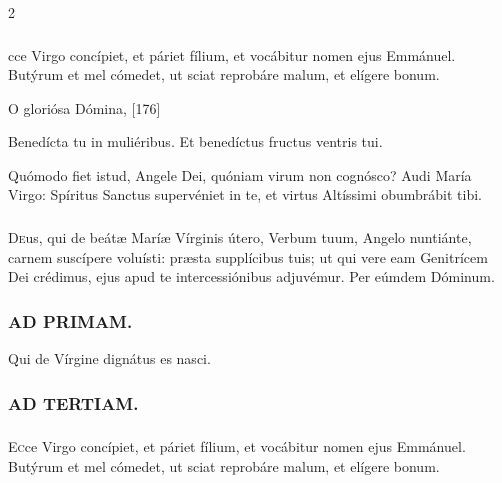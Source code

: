 \documentclass[9pt,twoside]{extarticle}
\begin{document}
\begin{multicols}{2}
\subsubsection*{}
cce Virgo concípiet, et páriet fílium, et vocábitur nomen ejus Emmánuel. Butýrum et mel cómedet, ut sciat reprobáre malum, et elígere bonum.

\begin{tightlist}{}
\item {} O gloriósa Dómina,  [176]
\item {} Benedícta tu in muliéribus.  Et benedíctus fructus ventris tui.
\item {} Quómodo fiet istud, Angele Dei, quóniam virum non cognósco? Audi María Virgo: Spíritus Sanctus supervéniet in te, et virtus Altíssimi obumbrábit tibi.
\end{tightlist}

\subsubsection*{\center {}}
\lettrine{D}eus, qui de beátæ Maríæ Vírginis útero, Verbum tuum, Angelo nuntiánte, carnem suscípere voluísti: præsta supplícibus tuis; ut qui vere eam Genitrícem Dei crédimus, ejus apud te intercessiónibus adjuvémur. Per eúmdem Dóminum.

\begin{tightlist}{}
\item {}
\end{tightlist}

\subsubsection*{\center \textsc{AD PRIMAM.}}
\noindent {} Qui de Vírgine dignátus es nasci.

\subsubsection*{\center \textsc{AD TERTIAM.}}
\subsubsection*{}
\lettrine{E}cce Virgo concípiet, et páriet fílium, et vocábitur nomen ejus Emmánuel. Butýrum et mel cómedet, ut sciat reprobáre malum, et elígere bonum.


\end{multicols}
\end{document}
